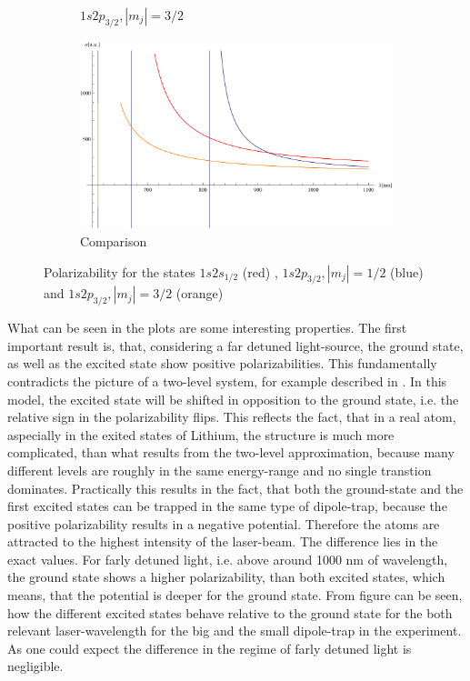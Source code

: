 \begin{figure}[H]
\begin{subfigure}[b]{0.4\textwidth}
                \caption{$1s2p_{3/2}, |m_j|=3/2$}
\end{subfigure}
\begin{subfigure}[b]{0.4\textwidth}
                \includegraphics[width=\textwidth]{alphaalltogether}
                \caption{Comparison}
\end{subfigure}




\caption{Polarizability \alpha for the states $1s2s_{1/2}$ (red) , $1s2p_{3/2}, |m_j|=1/2$ (blue) and  $1s2p_{3/2}, |m_j|=3/2$ (orange)}
\label{alphages}
\end{figure}
What can be seen in the plots are some interesting properties. The first important result is, that, considering a far detuned light-source, the ground state, as well as the excited state show positive polarizabilities. This fundamentally contradicts the picture of a two-level system, for example described in \cite{cohen}. In this model, the excited state will be shifted in opposition to the ground state, i.e. the relative sign in the polarizability flips. This reflects the fact, that in a real atom, aspecially in the exited states of Lithium, the structure is much more complicated, than what results from the two-level approximation, because many different levels are roughly in the same energy-range and no single transtion dominates. Practically this results in the fact, that both the ground-state and the first excited states can be trapped in the same type of dipole-trap, because the positive polarizability results in a negative potential. Therefore the atoms are attracted to the highest intensity of the laser-beam. The difference lies in the exact values. For farly detuned light, i.e. above around 1000 nm of wavelength, the ground state shows a higher polarizability, than both excited states, which means, that the potential is deeper for the ground state. From figure \label{relativealpha} can be seen, how the different excited states behave relative to the ground state for the both relevant laser-wavelength for the big and the small dipole-trap in the experiment. As one could expect the difference in the regime of farly detuned light is negligible.

